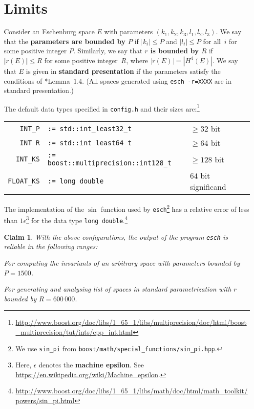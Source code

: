 \documentclass{article}
\newtheorem{claim}{Claim}
\newcommand{\abs}[1]{\left|#1\right|}
\newcommand{\macheps}{\epsilon} %
\begin{document}
\section*{Limits}
Consider an Eschenburg space \(E\) with parameters \((k_1,k_2,k_3,l_1,l_2,l_3)\).   We say that the \textbf{parameters are bounded by \(P\)} if \(\abs{k_i}\leq P\) and \(\abs{l_i}\leq P\) for all~\(i\) for some positive integer \(P\).  Similarly, we say that \textbf{\(r\) is bounded by \(R\)} if \(\abs{r(E)}\leq R\) for some positive integer~\(R\), where  \(\abs{r(E)} = |H^4(E)|\).  We say that \(E\) is given in \textbf{standard presentation} if the parameters satisfy the conditions of \cite{CEZ}*{Lemma~1.4}.  (All spaces generated using \verb+esch -r=XXXX+ are in standard presentation.)

The default data types specified in \verb+config.h+ and their sizes are:\footnote{
  \mbox{\url{http://www.boost.org/doc/libs/1_65_1/libs/multiprecision/doc/html/boost_multiprecision/tut/ints/cpp_int.html}}%
}

  \begin{tabular}{rp{22em}l}
    \verb+INT_P+ & \verb+:= std::int_least32_t+ & \(\geq 32\) bit \\
    \verb+INT_R+ & \verb+:= std::int_least64_t+ & \(\geq 64\) bit \\
    \verb+INT_KS+ & \verb+:= boost::multiprecision::int128_t+ & \(\geq 128\) bit \\
    \verb+FLOAT_KS+ & \verb+:= long double+ & \(64\) bit significand
  \end{tabular}

The implementation of the \(\sin\) function used by \verb+esch+\footnote{
  We use \verb+sin_pi+ from \verb+boost/math/special_functions/sin_pi.hpp+.%
}
has a relative error of less than \(1\macheps\)\footnote{\label{footnote:macheps}%
  Here, \(\macheps\) denotes the \textbf{machine epsilon}.
  See \url{https://en.wikipedia.org/wiki/Machine_epsilon}.%
}
for the data type \texttt{long double}.\footnote{
  \mbox{\url{http://www.boost.org/doc/libs/1_65_1/libs/math/doc/html/math_toolkit/powers/sin_pi.html}}%
}

\begin{claim}\label{claim:default}
  With the above configurations, the output of the program \verb+esch+ is reliable in the following ranges:
  \begin{compactitem}
  \item For computing the invariants of an arbitrary space with parameters bounded by \(P=1500\).
  \item For generating and analysing list of spaces in standard parametrization with \(r\) bounded by \(R=600\,000\).
  \end{compactitem}
\end{claim}
\end{document}
